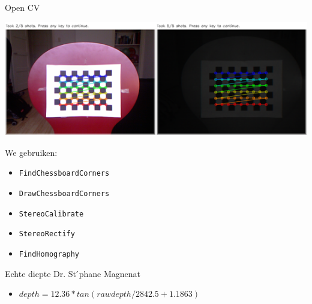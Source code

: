 \documentclass{beamer}
\begin{document}
\begin{frame}{Open CV}
{
\centerline{\includegraphics[scale=0.4]{chessboard.png}}
}
{
We gebruiken:
\begin{itemize}
\item \texttt{FindChessboardCorners}
\item \texttt{DrawChessboardCorners}
\item \texttt{StereoCalibrate}
\item \texttt{StereoRectify}
\item \texttt{FindHomography}
\end{itemize}
}
\end{frame}

\begin{frame}{Echte diepte}
Dr. St ́phane Magnenat

\begin{itemize}
\item $depth = 12.36 * tan(rawdepth / 2842.5 + 1.1863)$
\end{itemize}
\end{frame}
\end{document}
